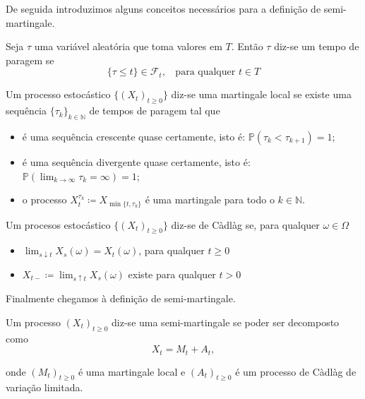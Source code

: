\documentclass{article}
\begin{document}
\vspace{1cm}
De seguida introduzimos alguns conceitos necessários para a definição de semi-martingale.

\vspace{0.5cm}

\begin{dfn}
    Seja $\tau$ uma variável aleatória que toma valores em $T$. Então $\tau$ diz-se um tempo de paragem se 
    $$\{ \tau \leq t\} \in \mathcal{F}_t, \;\;\text{  para qualquer } t \in T$$
\end{dfn}

\vspace{0.2cm}

\begin{dfn}
    Um processo estocástico $\{ (X_t)_{t \geq 0} \}$ diz-se uma martingale local se existe uma sequência $\{\tau_k\}_{k \in \mathbb{N}}$ de tempos de paragem tal que 
    \begin{itemize}
        \item é uma sequência crescente quase certamente, isto é: $\mathbb{P}(\tau_k<\tau_{k+1})=1$;
        \item é uma sequência divergente quase certamente, isto é: $\mathbb{P}(\lim_{k \rightarrow\infty}\tau_k= \infty)=1$;
        \item o processo $X_t^{\tau_k} \coloneq X_{\min\{t,\tau_k\}}$ é uma martingale para todo o $k \in \mathbb{N}$.
    \end{itemize}
\end{dfn}

\vspace{0.2cm}

\begin{dfn}
    Um procesos estocástico $\{ (X_t)_{t \geq 0} \}$ diz-se de Càdlàg se, para qualquer $\omega \in \Omega$
    \begin{itemize}
        \item $\lim_{s \downarrow t} X_s(\omega) = X_t(\omega)$, para qualquer $t \geq0$\\
        \item $X_{t-} \coloneq \lim_{s \uparrow t} X_s(\omega)$ existe para qualquer $t >0$
    \end{itemize}
\end{dfn}

\vspace{0.2cm}

Finalmente chegamos à definição de semi-martingale.

\begin{dfn}
    Um processo $(X_{t})_{t \geq 0}$ diz-se uma semi-martingale se poder ser decomposto como 
    $$X_t=M_t+A_t,$$

    onde $(M_t)_{t \geq 0}$ é uma martingale local e $(A_t)_{t \geq 0}$ é um processo de Càdlàg de variação limitada.

\end{dfn}
\end{document}

